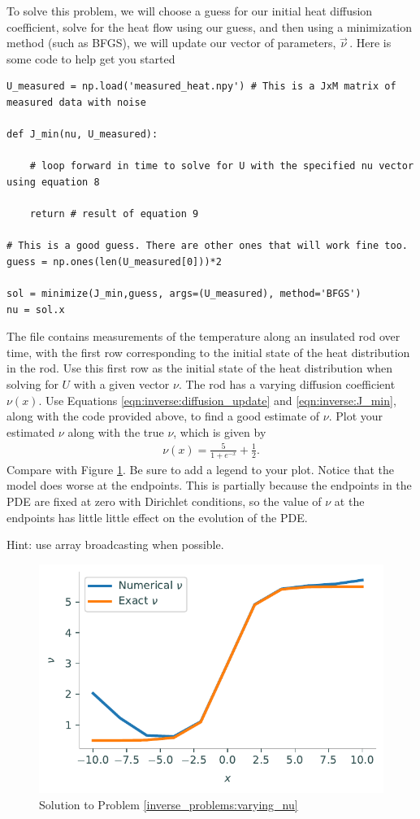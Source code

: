 To solve this problem, we will choose a guess for our initial heat diffusion coefficient, solve for the heat flow using our guess, and then using a minimization method (such as BFGS), we will update our vector of parameters, $\vec{\nu}^{\,}$. Here is some code to help get you started

\begin{lstlisting}
U_measured = np.load('measured_heat.npy') # This is a JxM matrix of measured data with noise

def J_min(nu, U_measured):

    # loop forward in time to solve for U with the specified nu vector using equation 8

    return # result of equation 9

# This is a good guess. There are other ones that will work fine too.
guess = np.ones(len(U_measured[0]))*2

sol = minimize(J_min,guess, args=(U_measured), method='BFGS')
nu = sol.x

\end{lstlisting}

\begin{problem}
The file  contains measurements of the temperature along an insulated rod over time, with the first row corresponding to the initial state of the heat distribution in the rod. Use this first row as the initial state of the heat distribution when solving for $U$ with a given vector $\nu$. 
The rod has a varying diffusion coefficient $\nu(x)$. Use Equations \eqref{eqn:inverse:diffusion_update} and \eqref{eqn:inverse:J_min}, along with the code provided above, to find a good estimate of $\nu$.
Plot your estimated $\nu$ along with the true $\nu$, which is given by
\begin{align*}
\nu(x) = \frac{5}{1+e^{-x}}+\frac{1}{2}.
\end{align*}
Compare with Figure \ref{fig:inverse_problems:find_nu}.
Be sure to add a legend to your plot.
Notice that the model does worse at the endpoints.
This is partially because the endpoints in the PDE are fixed at zero with Dirichlet conditions, so the value of $\nu$ at the endpoints has little little effect on the evolution of the PDE.

Hint: use array broadcasting when possible.
\label{inverse_problems:varying_nu}
\end{problem}

\begin{figure}[H]
\centering
\includegraphics[width=\textwidth]{figures/spatially_dependent_nu.pdf}
\caption{Solution to Problem \ref{inverse_problems:varying_nu}}
\label{fig:inverse_problems:find_nu}
\end{figure}
